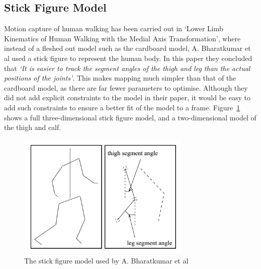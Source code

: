 \subsection{Stick Figure Model}

Motion capture of human walking has been carried out in `Lower Limb Kinematics of Human Walking with the Medial Axis Transformation'\cite{stickfigure}, where instead of a fleshed out model such as the cardboard model, A. Bharatkumar et al used a stick figure to represent the human body. In this paper they concluded that \emph{`It is easier to track the segment angles of the thigh and leg than the actual positions of the joints'}. This makes mapping much simpler than that of the cardboard model, as there are far fewer parameters to optimise. Although they did not add explicit constraints to the model in their paper, it would be easy to add such constraints to ensure a better fit of the model to a frame. Figure~\ref{fig:stickfiguremodel} shows a full three-dimensional stick figure model, and a two-dimensional model of the thigh and calf.

\begin{figure}[H]
    \centering
    \includegraphics[height=6cm]{background/images/stickfigure}

	\caption{The stick figure model used by A. Bharatkumar et al\cite{stickfigure}}
	\label{fig:stickfiguremodel}
\end{figure}